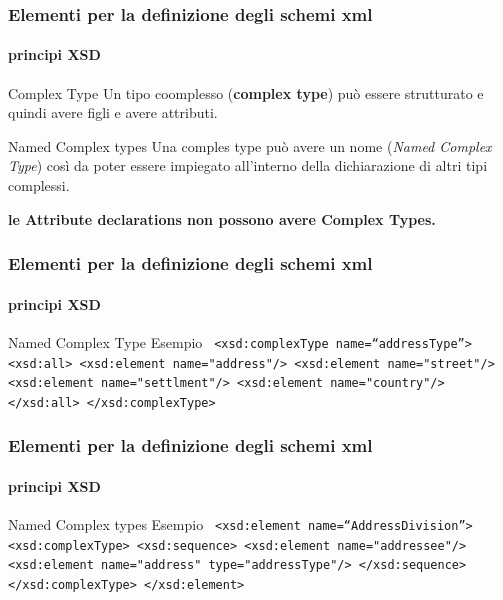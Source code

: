 

\begin{frame}
	\frametitle{Elementi per la definizione degli schemi xml}
	\framesubtitle{principi XSD}
	\addtocounter{nframe}{1}

	\begin{block}{Complex Type}
		Un tipo coomplesso (\textbf{complex type}) può essere strutturato e quindi avere figli e avere attributi.

	\end{block}

	\begin{block}{Named Complex types}
		Una comples type può avere un nome (\textit{Named Complex Type}) così da poter essere impiegato all'interno della dichiarazione di altri tipi complessi.
	\end{block}

	\textbf{le Attribute declarations non possono avere Complex Types.}

\end{frame}




\begin{frame}
	\frametitle{Elementi per la definizione degli schemi xml}
	\framesubtitle{principi XSD}
	\addtocounter{nframe}{1}

	\begin{block}{Named Complex Type Esempio}
		\texttt{
			<xsd:complexType name=``addressType''>
			<xsd:all>
			<xsd:element name="address"/>
			<xsd:element name="street"/>
			<xsd:element name="settlment"/>
			<xsd:element name="country"/>
			</xsd:all>
			</xsd:complexType>
		}
	\end{block}

\end{frame}

\begin{frame}
	\frametitle{Elementi per la definizione degli schemi xml}
	\framesubtitle{principi XSD}
	\addtocounter{nframe}{1}

	\begin{block}{Named Complex types Esempio}
		\texttt{
			<xsd:element name=``AddressDivision''>
			<xsd:complexType>
			<xsd:sequence>
			<xsd:element name="addressee"/>
			<xsd:element name="address" type="addressType"/>
			</xsd:sequence>
			</xsd:complexType>
			</xsd:element>
		}
	\end{block}

\end{frame}

